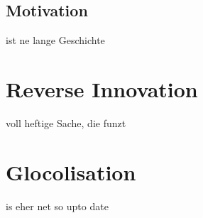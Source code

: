 \documentclass[a4paper,11pt]{scrartcl}
\begin{document}
\subsection{Motivation}
ist ne lange Geschichte
\section{Reverse Innovation}
voll heftige Sache, die funzt
\section{Glocolisation}
is eher net so upto date


\end{document}

